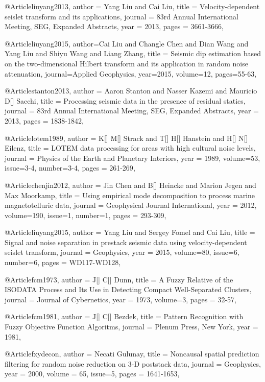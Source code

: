 @Article{liuyang2013,
  author = 	 {Yang Liu and Cai Liu},
  title = 	 {Velocity-dependent seislet transform and its applications},
  journal = 	 {83rd Annual International Meeting, SEG, Expanded Abstracts},
  year = 	 2013,
  pages =	 {3661-3666},
}

@Article{liuyang2015,
  author={Cai Liu and Changle Chen and Dian Wang and Yang Liu and Shiyu Wang and Liang Zhang},
  title = {Seismic dip estimation based on the two-dimensional Hilbert transform and its application in random noise attenuation},
  journal={Applied Geophysics},
  year=2015,
  volume=12,
  pages={55-63},
}

@Article{stanton2013,
  author = 	 {Aaron Stanton and Nasser Kazemi and Mauricio D[] Sacchi},
  title = 	 {Processing seismic data in the presence of residual statics},
  journal = 	 {83rd Annual International Meeting, SEG, Expanded Abstracts},
  year = 	 2013,
  pages =	 {1838-1842},
}

@Article{lotem1989,
  author =	 { K[] M[] Strack and T[] H[] Hanstein and H[] N[] Eilenz},
  title =	 {LOTEM data processing for areas with high cultural noise levels},
  journal =	 {Physics of the Earth and Planetary Interiors},
  year =	 1989,
  volume=53,
  issue=3-4,
  number=3-4,
  pages =	 {261-269},
}

@Article{chenjin2012,
  author =	 {Jin Chen and B[] Heincke and Marion Jegen and Max Moorkamp},
  title =	 {Using empirical mode decomposition to process marine magnetotelluric data},
  journal =	 {Geophysical Journal International},
  year =	 2012,
  volume=190,
  issue=1,
  number=1,
  pages =	 {293-309},
}


@Article{liuyang2015,
  author =	 { Yang Liu and Sergey Fomel and Cai Liu},
  title =	 {Signal and noise separation in prestack seismic data using velocity-dependent seislet transform},
  journal =	 {Geophysics},
  year =	 2015,
  volume=80,
  issue=6,
  number=6,
  pages =	 {WD117-WD128},
}

@Article{fcm1973,
  author =	 { J[] C[] Dunn},
  title =	 {A Fuzzy Relative of the ISODATA Process and Its Use in Detecting Compact Well-Separated Clusters},
  journal =	 {Journal of Cybernetics},
  year =	 1973,
  volume=3,
  pages =	 {32-57},
}

@Article{fcm1981,
  author =	 { J[] C[] Bezdek},
  title =	 {Pattern Recognition with Fuzzy Objective Function Algoritms},
  journal =	 {Plenum Press, New York},
  year =	 1981,
}

@Article{fxydecon,
  author =	 {Necati Gulunay},
  title =	 {Noncausal spatial prediction filtering for random noise reduction on 3-D poststack data},
  journal =	 {Geophysics},
  year =	 2000,
  volume = 65,
  issue={5}, 
  pages =	 {1641-1653},
}	




